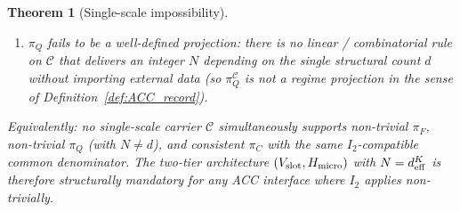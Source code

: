 \documentclass[11pt]{article}
\theoremstyle{plain}
\newtheorem{theorem}{Theorem}[section]
\theoremstyle{definition}
\theoremstyle{remark}
\begin{document}
\begin{theorem}[Single-scale impossibility]
\begin{enumerate}[leftmargin=2.5em,label=\textup{(\roman*)},itemsep=3pt]
  \item \emph{$\pi_Q$ fails to be a well-defined projection}: there is no linear / combinatorial rule on $\mathcal{C}$ that delivers an integer $N$ depending on the single structural count $d$ without importing external data (so $\pi_Q^{\mathcal{C}}$ is not a regime projection in the sense of Definition~\ref{def:ACC_record}).
\end{enumerate}
Equivalently: no single-scale carrier $\mathcal{C}$ simultaneously supports non-trivial $\pi_F$, non-trivial $\pi_Q$ (with $N \neq d$), and consistent $\pi_C$ with the same $I_2$-compatible common denominator.  The two-tier architecture $(V_{\rm slot}, H_{\rm micro})$ with $N = d_{\rm eff}^K$ is therefore \emph{structurally mandatory} for any ACC interface where $I_2$ applies non-trivially.
\end{theorem}
\end{document}
